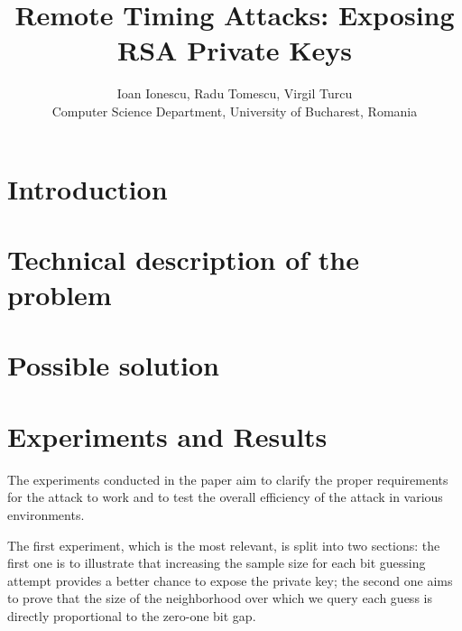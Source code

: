 \documentclass[a4paper,10pt,twocolumn,english]{article}
\title{Remote Timing Attacks: Exposing RSA Private Keys}
\author{
    Ioan Ionescu, 
    Radu Tomescu,
    Virgil Turcu\\
	\footnotesize Computer Science Department, University of Bucharest, Romania
}
\date{\empty} %
\begin{document}
\maketitle
\begin{abstract} 
\end{abstract}
\section{Introduction}




\section{Technical description of the problem}




\section{Possible solution}


\section{Experiments and Results}
The experiments conducted in the paper aim to clarify the proper requirements
for the attack to work and to test the overall efficiency of the attack in various environments.

The first experiment, which is the most relevant, is split into two sections: the first one is to illustrate that increasing
the sample size for each bit guessing attempt provides a better chance to expose the private key;
the second one aims to prove that the size of the neighborhood over which we query each guess is directly proportional to the zero-one bit gap. 
\end{document}
